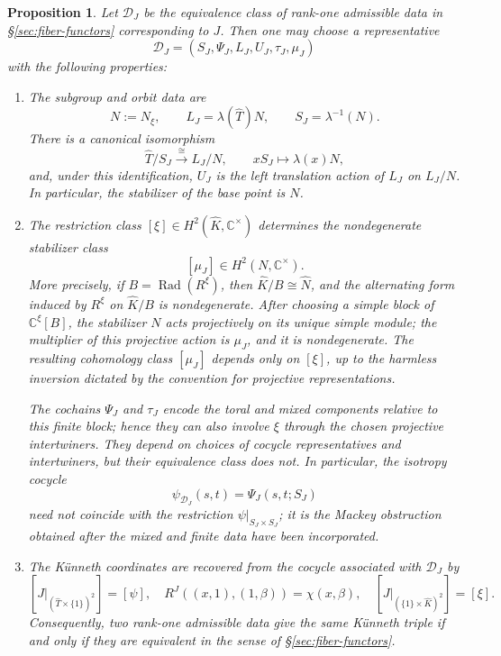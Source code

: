 \documentclass{amsart}
\newtheorem{proposition}[theorem]{Proposition}
\theoremstyle{definition}
\newcommand{\Rad}{\operatorname{Rad}}
\newcommand{\Ctimes}{\mathbb{C}^{\times}}
\numberwithin{equation}{section}
\begin{document}
\begin{proposition}
\label{prop:kunneth-equivariantization-dictionary}
Let $\mathcal D_J$ be the equivalence class of rank-one admissible data in
\S\ref{sec:fiber-functors} corresponding to $J$.  Then one may choose a
representative
\[
 \mathcal D_J=(S_J,\Psi_J,L_J,U_J,\tau_J,\mu_J)
\]
with the following properties:
\begin{enumerate}

\item The subgroup and orbit data are
\begin{equation}\label{eq:dictionary-S-L}
 N:=N_\xi,
 \qquad
 L_J=\lambda(\widehat T)N,
 \qquad
 S_J=\lambda^{-1}(N).
\end{equation}
There is a canonical isomorphism
\begin{equation}\label{eq:dictionary-orbit}
 \widehat T/S_J\xrightarrow{\cong}L_J/N,
 \qquad
 xS_J\longmapsto\lambda(x)N,
\end{equation}
and, under this identification, $U_J$ is the left translation action of
$L_J$ on $L_J/N$.  In particular, the stabilizer of the base point is $N$.

\item The restriction class $[\xi]\in H^2(\widehat K,\Ctimes)$ determines the
nondegenerate stabilizer class
\[
 [\mu_J]\in H^2(N,\Ctimes).
\]
More precisely, if $B=\Rad(R^\xi)$, then
$\widehat K/B\cong\widehat N$, and the alternating form induced by $R^\xi$ on
$\widehat K/B$ is nondegenerate.  After choosing a simple block of
$\mathbb C^\xi[B]$, the stabilizer $N$ acts projectively on its unique simple
module; the multiplier of this projective action is $\mu_J$, and it is
nondegenerate.  The resulting cohomology class $[\mu_J]$ depends only on
$[\xi]$, up to the harmless inversion dictated by the convention for
projective representations.

The cochains $\Psi_J$ and $\tau_J$ encode the toral and mixed components
relative to this finite block; hence they can also involve $\xi$ through the
chosen projective intertwiners.  They depend on choices of cocycle
representatives and intertwiners, but their equivalence class does not.  In
particular, the isotropy cocycle
\[
 \psi_{\mathcal D_J}(s,t)=\Psi_J(s,t;S_J)
\]
need not coincide with the restriction
$\psi|_{S_J\times S_J}$; it is the Mackey obstruction obtained after the
mixed and finite data have been incorporated.

\item The K\"unneth coordinates are recovered from the cocycle associated
with $\mathcal D_J$ by
\begin{equation}\label{eq:recover-kunneth}
 \left[
 J\big|_{(\widehat T\times\{1\})^2}
 \right]=[\psi],
 \quad
 R^J((x,1),(1,\beta))=\chi(x,\beta),
 \quad
 \left[
 J\big|_{(\{1\}\times \widehat K)^2}
 \right]=[\xi].
\end{equation}
Consequently, two rank-one admissible data give the same K\"unneth triple if
and only if they are equivalent in the sense of
\S\ref{sec:fiber-functors}.


\end{enumerate}
\end{proposition}
\end{document}
